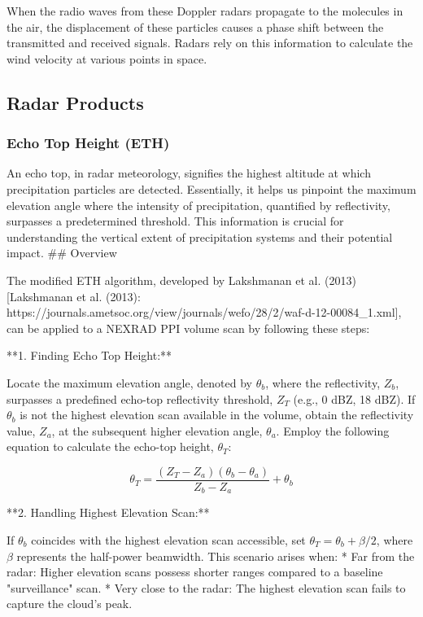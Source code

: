 When the radio waves from these Doppler radars propagate to the molecules in the
air, the displacement of these particles causes a phase shift between the
transmitted and received signals. Radars rely on this information to calculate
the wind velocity at various points in space.

\subsection{Radar Products}

\subsubsection{Echo Top Height (ETH)}
An echo top, in radar meteorology, signifies the highest altitude at which
precipitation particles are detected. Essentially, it helps us pinpoint the
maximum elevation angle where the intensity of precipitation, quantified by
reflectivity, surpasses a predetermined threshold. This information is crucial
for understanding the vertical extent of precipitation systems and their
potential impact. ## Overview

The modified ETH algorithm, developed by Lakshmanan et al. (2013) [Lakshmanan et
al. (2013):
https://journals.ametsoc.org/view/journals/wefo/28/2/waf-d-12-00084_1.xml], can
be applied to a NEXRAD PPI volume scan by following these steps:

**1. Finding Echo Top Height:**

Locate the maximum elevation angle, denoted by $\theta_{b}$, where the
reflectivity, $Z_{b}$, surpasses a predefined echo-top reflectivity threshold,
$Z_T$ (e.g., 0 dBZ, 18 dBZ). If $\theta_{b}$ is not the highest elevation scan
available in the volume, obtain the reflectivity value, $Z_{a}$, at the
subsequent higher elevation angle, $\theta_{a}$. Employ the following equation
to calculate the echo-top height, $\theta_T$:

$$\theta_T = \frac{(Z_T - Z_a) (\theta_b - \theta_a)}{Z_b - Z_a} + \theta_b$$

**2. Handling Highest Elevation Scan:**

If $\theta_{b}$ coincides with the highest elevation scan accessible, set
    $\theta_{T} = \theta_{b} + \beta/2$, where $\beta$ represents the half-power
    beamwidth. This scenario arises when: * Far from the radar: Higher elevation
    scans possess shorter ranges compared to a baseline "surveillance" scan. *
    Very close to the radar: The highest elevation scan fails to capture the
    cloud's peak.

